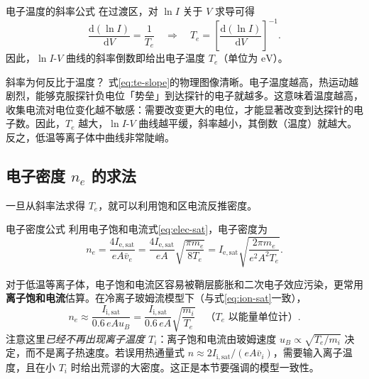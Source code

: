\documentclass[12pt,a4paper,openany,oneside]{book}
\newcommand{\diff}{\mathrm{d}}
\begin{document}
\begin{corollary}{电子温度的斜率公式}{}{}
在过渡区，对 $\ln I$ 关于 $V$ 求导可得
\begin{equation}
\frac{\diff (\ln I)}{\diff V} = \frac{1}{T_e}
\quad\Longrightarrow\quad
T_e = \left[\frac{\diff (\ln I)}{\diff V}\right]^{-1}.
\label{eq:te-slope}
\end{equation}
因此，$\ln I$-$V$ 曲线的斜率倒数即给出电子温度 $T_e$（单位为 $\mathrm{eV}$）。
\end{corollary}

\begin{insight}{斜率为何反比于温度？}{}
式\eqref{eq:te-slope}的物理图像清晰。电子温度越高，热运动越剧烈，能够克服探针负电位「势垒」到达探针的电子就越多。这意味着温度越高，收集电流对电位变化越不敏感：需要改变更大的电位，才能显著改变到达探针的电子数。因此，$T_e$ 越大，$\ln I$-$V$ 曲线越平缓，斜率越小，其倒数（温度）就越大。反之，低温等离子体中曲线非常陡峭。
\end{insight}

\subsection{电子密度 \texorpdfstring{$n_e$}{ne} 的求法}

一旦从斜率法求得 $T_e$，就可以利用饱和区电流反推密度。

\begin{corollary}{电子密度公式}{}{}
利用电子饱和电流式\eqref{eq:elec-sat}，电子密度为
\begin{equation}
n_e = \frac{4 I_{\mathrm{e,sat}}}{e A \bar{v}_e}
= \frac{4 I_{\mathrm{e,sat}}}{e A}\sqrt{\frac{\pi m_e}{8 T_e}}
= I_{\mathrm{e,sat}} \sqrt{\frac{2\pi m_e}{e^2 A^2 T_e}}.
\label{eq:ne-from-sat}
\end{equation}

对于低温等离子体，电子饱和电流区容易被鞘层膨胀和二次电子效应污染，更常用\textbf{离子饱和电流}估算。在冷离子玻姆流模型下（与式\eqref{eq:ion-sat}一致），
\begin{equation}
n_e \approx \frac{I_{\mathrm{i,sat}}}{0.6\, e A u_B}
= \frac{I_{\mathrm{i,sat}}}{0.6\, e A}\sqrt{\frac{m_i}{T_e}}
\quad \text{（$T_e$ 以能量单位计）}.
\label{eq:ne-from-ion-sat}
\end{equation}
注意这里\emph{已经不再出现离子温度 $T_i$}：离子饱和电流由玻姆速度 $u_B\propto\sqrt{T_e/m_i}$ 决定，而不是离子热速度。若误用热通量式 $n\approx 2I_{\mathrm{i,sat}}/(eA\bar v_i)$，需要输入离子温度，且在小 $T_i$ 时给出荒谬的大密度。这正是本节要强调的模型一致性。
\end{corollary}
\end{document}
